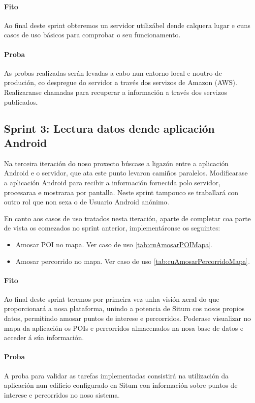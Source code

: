 \paragraph{Fito}
Ao final deste sprint obteremos un servidor utilizábel dende calquera lugar e cuns casos de uso básicos para comprobar o seu funcionamento.

\paragraph{Proba}
As probas realizadas serán levadas a cabo nun entorno local e noutro de produción, co despregue do servidor a través dos servizos de Amazon (AWS). Realizaranse chamadas para recuperar a información a través dos servizos publicados.

\subsection{Sprint 3: Lectura datos dende aplicación Android}
Na terceira iteración do noso proxecto búscase a ligazón entre a aplicación Android e o servidor, que ata este punto levaron camiños paralelos. Modificarase a aplicación Android para recibir a información fornecida polo servidor, procesaraa e mostraraa por pantalla. Neste sprint tampouco se traballará con outro rol que non sexa o de Usuario Android anónimo.

En canto aos casos de uso tratados nesta iteración, aparte de completar coa parte de vista os comezados no sprint anterior, implementáronse os seguintes:

\begin{itemize}
	\item Amosar POI no mapa. Ver caso de uso \ref{tab:cuAmosarPOIMapa}.
	\item Amosar percorrido no mapa. Ver caso de uso \ref{tab:cuAmosarPercorridoMapa}.
\end{itemize}

\paragraph{Fito}
Ao final deste sprint teremos por primeira vez unha visión xeral do que proporcionará a nosa plataforma, unindo a potencia de Situm cos nosos propios datos, permitindo amosar puntos de interese e percorridos. Poderase visualizar no mapa da aplicación os POIs e percorridos almacenados na nosa base de datos e acceder á súa información.

\paragraph{Proba}
A proba para validar as tarefas implementadas consistirá na utilización da aplicación nun edificio configurado en Situm con información sobre puntos de interese e percorridos no noso sistema.

